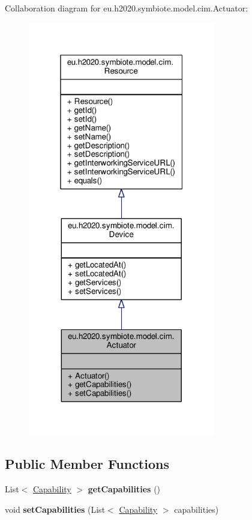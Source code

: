 Collaboration diagram for eu.\+h2020.\+symbiote.\+model.\+cim.\+Actuator\+:\nopagebreak
\begin{figure}[H]
\begin{center}
\leavevmode
\includegraphics[width=232pt]{classeu_1_1h2020_1_1symbiote_1_1model_1_1cim_1_1Actuator__coll__graph}
\end{center}
\end{figure}
\subsection*{Public Member Functions}
\begin{DoxyCompactItemize}
\item 
\mbox{\label{classeu_1_1h2020_1_1symbiote_1_1model_1_1cim_1_1Actuator_ae11f2ea511931a50467ede9652079a6d}} 
List$<$ \hyperlink{classeu_1_1h2020_1_1symbiote_1_1model_1_1cim_1_1Capability}{Capability} $>$ {\bfseries get\+Capabilities} ()
\item 
\mbox{\label{classeu_1_1h2020_1_1symbiote_1_1model_1_1cim_1_1Actuator_a857f30bb688b4ccea031a9e263ce2157}} 
void {\bfseries set\+Capabilities} (List$<$ \hyperlink{classeu_1_1h2020_1_1symbiote_1_1model_1_1cim_1_1Capability}{Capability} $>$ capabilities)
\end{DoxyCompactItemize}


